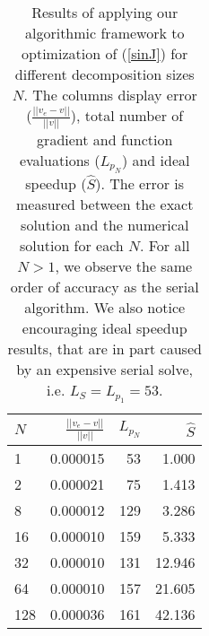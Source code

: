 \\
\begin{table}[h]
\caption{Results of applying our algorithmic framework to optimization of (\ref{sinJ}) for different decomposition sizes $N$. The columns display error ($\frac{||v_e-v||}{||v||}$), total number of gradient and function evaluations ($L_{p_N}$) and ideal speedup ($\hat S$). The error is measured between the exact solution and the numerical solution for each $N$. For all $N>1$, we observe the same order of accuracy as the serial algorithm. We also notice encouraging ideal speedup results, that are in part caused by an expensive serial solve, i.e. $L_S=L_{p_1}=53$. }
\centering
\label{unsmoothTab}
\begin{tabular}{lrrr}
\toprule
{} $N$&   $\frac{||v_e-v||}{||v||}$ &  $L_{p_N}$ &     $\hat S$ \\
\midrule
1   &  0.000015 &   53 &   1.000 \\
2   &  0.000021 &   75 &   1.413 \\
8   &  0.000012 &  129 &   3.286 \\
16  &  0.000010 &  159 &   5.333 \\
32  &  0.000010 &  131 &  12.946 \\
64  &  0.000010 &  157 &  21.605 \\
128 &  0.000036 &  161 &  42.136 \\
\bottomrule
\end{tabular}
\end{table}

